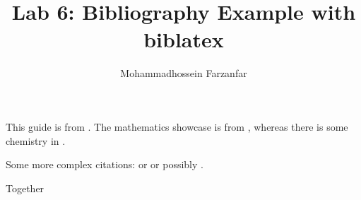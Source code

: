\documentclass{article}
\author{Mohammadhossein Farzanfar}
\title{Lab 6: Bibliography Example with biblatex}
\begin{document}
\maketitle
This guide is from \autocite{Kulyabov2023}. The mathematics showcase is from \autocite{Graham1995}, whereas there is some chemistry in \autocite{Thomas2008}.

Some more complex citations: \parencite{Kulyabov2023} or \textcite{Thomas2008} or possibly .

\autocite[56]{Thomas2008}

\autocite[See][45-48]{Graham1995}

Together \autocite{Kulyabov2023,Thomas2008,Graham1995}

\printbibliography
\end{document}
